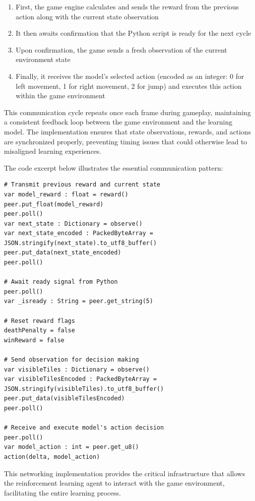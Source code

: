 \begin{enumerate}
    \item First, the game engine calculates and sends the reward from the previous action along with the current state observation
    \item It then awaits confirmation that the Python script is ready for the next cycle
    \item Upon confirmation, the game sends a fresh observation of the current environment state
    \item Finally, it receives the model's selected action (encoded as an integer: 0 for left movement, 1 for right movement, 2 for jump) and executes this action within the game environment
\end{enumerate}

This communication cycle repeats once each frame during gameplay, maintaining a consistent feedback loop between the game environment and the learning model. 
The implementation ensures that state observations, rewards, and actions are synchronized properly, preventing timing issues that could otherwise lead to misaligned learning experiences.

The code excerpt below illustrates the essential communication pattern:

\singlespaced
\begin{verbatim}
# Transmit previous reward and current state
var model_reward : float = reward()
peer.put_float(model_reward)
peer.poll()
var next_state : Dictionary = observe()
var next_state_encoded : PackedByteArray = JSON.stringify(next_state).to_utf8_buffer()
peer.put_data(next_state_encoded)
peer.poll()

# Await ready signal from Python
peer.poll()
var _isready : String = peer.get_string(5)

# Reset reward flags
deathPenalty = false
winReward = false

# Send observation for decision making
var visibleTiles : Dictionary = observe()
var visibleTilesEncoded : PackedByteArray = JSON.stringify(visibleTiles).to_utf8_buffer()
peer.put_data(visibleTilesEncoded)
peer.poll()

# Receive and execute model's action decision
peer.poll()
var model_action : int = peer.get_u8()
action(delta, model_action)
\end{verbatim}
\doublespaced

This networking implementation provides the critical infrastructure that allows the reinforcement learning agent to interact with the game environment, facilitating the entire learning process.

